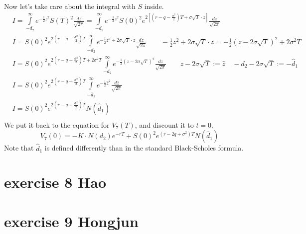 \documentclass{article}
\begin{document}
Now let's take care about the integral with $S$ inside.
\begin{align}
     & I=\int\limits_{-{{d}_{2}}}^{\infty }{{{e}^{-\frac{1}{2}{{z}^{2}}}}S{{\left( T \right)}^{2}}\frac{dz}{\sqrt{2\pi }}}=\int\limits_{-{{d}_{2}}}^{\infty }{{{e}^{-\frac{1}{2}{{z}^{2}}}}S{{\left( 0 \right)}^{2}}{{e}^{2\left[ \left( r-q-\frac{{{\sigma }^{2}}}{2} \right)T+\sigma \sqrt{T}\cdot z \right]}}\frac{dz}{\sqrt{2\pi }}} \\
     & I=S{{\left( 0 \right)}^{2}}{{e}^{2\left( r-q-\frac{{{\sigma }^{2}}}{2} \right)T}}\int\limits_{-{{d}_{2}}}^{\infty }{{{e}^{-\frac{1}{2}{{z}^{2}}+2\sigma \sqrt{T}\cdot z}}\frac{dz}{\sqrt{2\pi }}}\qquad -\frac{1}{2}{{z}^{2}}+2\sigma \sqrt{T}\cdot z=-\frac{1}{2}{{\left( z-2\sigma \sqrt{T} \right)}^{2}}+2{{\sigma }^{2}}T     \\
     & I=S{{\left( 0 \right)}^{2}}{{e}^{2\left( r-q-\frac{{{\sigma }^{2}}}{2} \right)T+2{{\sigma }^{2}}T}}\int\limits_{-{{d}_{2}}}^{\infty }{{{e}^{-\frac{1}{2}{{\left( z-2\sigma \sqrt{T} \right)}^{2}}}}\frac{dz}{\sqrt{2\pi }}}\qquad z-2\sigma \sqrt{T}:=\hat{z}\quad -{{d}_{2}}-2\sigma \sqrt{T}:=-{{{\hat{d}}}_{1}}                \\
     & I=S{{\left( 0 \right)}^{2}}{{e}^{2\left( r-q+\frac{{{\sigma }^{2}}}{2} \right)T}}\int\limits_{-{{{\hat{d}}}_{1}}}^{\infty }{{{e}^{-\frac{1}{2}{{{\hat{z}}}^{2}}}}\frac{d\hat{z}}{\sqrt{2\pi }}}                                                                                                                                   \\
     & I=S{{\left( 0 \right)}^{2}}{{e}^{2\left( r-q+\frac{{{\sigma }^{2}}}{2} \right)T}}N\left( {{{\hat{d}}}_{1}} \right)                                                                                                                                                                                                                \\
\end{align}
We put it back to the equation for $V_7(T)$, and discount it to $t=0$.
\[{{V}_{7}}\left( 0 \right)=-K\cdot N\left( {{d}_{2}} \right) e^{-rT} +S{{\left( 0 \right)}^{2}}{{e}^{\left( r - 2q + {\sigma }^{2} \right)T}}N\left( {{{\hat{d}}}_{1}} \right)\]
Note that $\hat{d}_1$ is defined differently than in the standard Black-Scholes formula.
\section{exercise 8 Hao}

\section{exercise 9 Hongjun}
\end{document}

